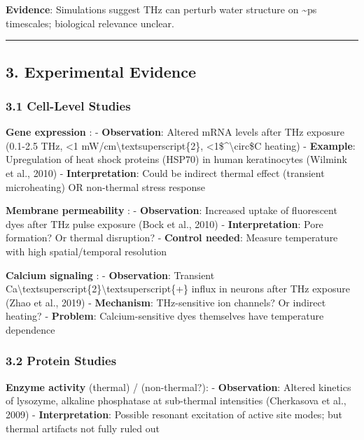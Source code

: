 \textbf{Evidence}: Simulations suggest THz can perturb water structure
on \textasciitilde ps timescales; biological relevance unclear.

\begin{center}\rule{0.5\linewidth}{0.5pt}\end{center}

\subsection{3. Experimental Evidence}\label{experimental-evidence}

\subsubsection{3.1 Cell-Level Studies}\label{cell-level-studies}

\textbf{Gene expression} : - \textbf{Observation}: Altered mRNA levels
after THz exposure (0.1-2.5 THz, \textless1
mW/cm\textbackslash textsuperscript\{2\},
\textless1\$\^{}\textbackslash circ\$C heating) - \textbf{Example}:
Upregulation of heat shock proteins (HSP70) in human keratinocytes
(Wilmink et al., 2010) - \textbf{Interpretation}: Could be indirect
thermal effect (transient microheating) OR non-thermal stress response

\textbf{Membrane permeability} : - \textbf{Observation}: Increased
uptake of fluorescent dyes after THz pulse exposure (Bock et al., 2010)
- \textbf{Interpretation}: Pore formation? Or thermal disruption? -
\textbf{Control needed}: Measure temperature with high spatial/temporal
resolution

\textbf{Calcium signaling} : - \textbf{Observation}: Transient
Ca\textbackslash textsuperscript\{2\}\textbackslash textsuperscript\{+\}
influx in neurons after THz exposure (Zhao et al., 2019) -
\textbf{Mechanism}: THz-sensitive ion channels? Or indirect heating? -
\textbf{Problem}: Calcium-sensitive dyes themselves have temperature
dependence

\subsubsection{3.2 Protein Studies}\label{protein-studies}

\textbf{Enzyme activity} (thermal) / (non-thermal?): -
\textbf{Observation}: Altered kinetics of lysozyme, alkaline phosphatase
at sub-thermal intensities (Cherkasova et al., 2009) -
\textbf{Interpretation}: Possible resonant excitation of active site
modes; but thermal artifacts not fully ruled out


